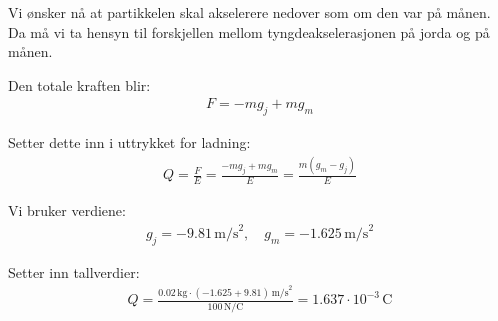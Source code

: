 \subsubsection{}

Vi ønsker nå at partikkelen skal akselerere nedover som om den var på månen. Da må vi ta hensyn til forskjellen mellom tyngdeakselerasjonen på jorda og på månen.

Den totale kraften blir:
\begin{align}
F = -mg_j + mg_m
\end{align}

Setter dette inn i uttrykket for ladning:
\begin{align}
Q = \frac{F}{E} = \frac{-mg_j + mg_m}{E} = \frac{m(g_m - g_j)}{E}
\end{align}

Vi bruker verdiene:
\begin{align}
g_j = -9.81\,\text{m/s}^2, \quad g_m = -1.625\,\text{m/s}^2
\end{align}

Setter inn tallverdier:
\begin{align}
Q = \frac{0.02\,\text{kg} \cdot (-1.625 + 9.81)\,\text{m/s}^2}{100\,\text{N/C}} = 1.637 \cdot 10^{-3}\,\text{C}
\end{align}

\newpage